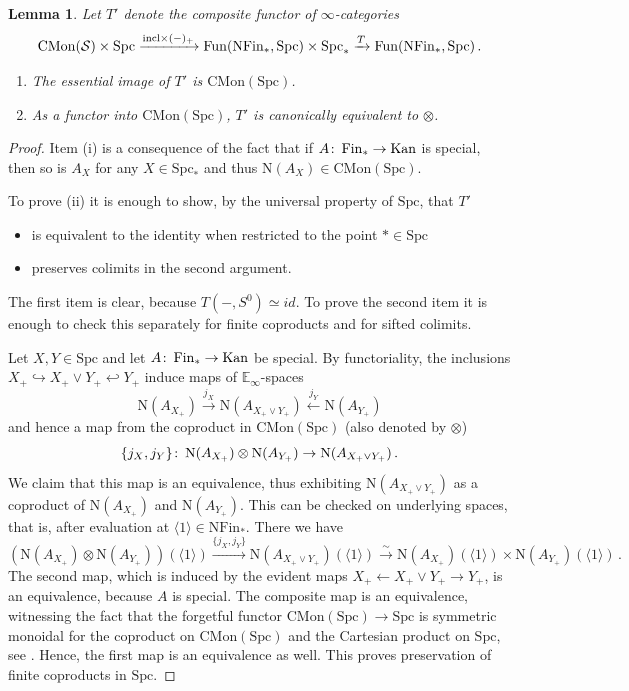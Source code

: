 \documentclass[oneside, a4paper, 12pt]{article}
\numberwithin{equation}{section}
\DeclareMathOperator{\Fun}{Fun}
\newcommand{\CMon}{\mathrm{CMon}}
\newcommand{\Spc}{\mathrm{Spc}}
\newcommand{\Fin}{\mathrm{Fin}}
\newcommand{\Kan}{\mathrm{Kan}}
\newcommand{\co}{\colon\thinspace}
\theoremstyle{plain}
\newtheorem{lemma}[theorem]{Lemma}
\theoremstyle{definition}
\theoremstyle{remark}
\begin{document}
\begin{lemma} \label{lem:tensoring}
Let $T'$ denote the composite functor of $\infty$-categories
\[
\CMon(\mathcal{S}) \times \Spc \xrightarrow{\textnormal{incl}\times (-)_+}  \Fun(\mathrm{N}\Fin_\ast,\Spc)\times \Spc_\ast \xrightarrow{T} \Fun(\mathrm{N}\Fin_\ast,\Spc)\, .
\]
\begin{enumerate}
\item[(i)] The essential image of $T'$ is $\CMon(\Spc)$.
\item[(ii)] As a functor into $\CMon(\Spc)$, $T'$ is canonically equivalent to $\otimes$.
\end{enumerate}
\end{lemma}
\begin{proof}
Item (i) is a consequence of the fact that if $A\co \Fin_\ast\to \Kan$ is special, then so is $A_X$ for any $X\in \Spc_\ast$ and thus $\mathrm{N}(A_X)\in \CMon(\Spc)$.

To prove (ii) it is enough to show, by the universal property of $\Spc$, that $T'$
\begin{itemize}
\item is equivalent to the identity when restricted to the point $\ast\in \Spc$
\item preserves colimits in the second argument.
\end{itemize}

The first item is clear, because $T(-,S^0)\simeq id$. To prove the second item it is enough to check this separately for finite coproducts and for sifted colimits.

Let $X,Y\in \Spc$ and let $A\co \Fin_\ast\to \Kan$ be special. By functoriality, the inclusions $X_+\hookrightarrow X_+\vee Y_+ \hookleftarrow Y_+$ induce maps of $\mathbb{E}_\infty$-spaces
\[
\mathrm{N} (A_{X_+}) \xrightarrow{j_X} \mathrm{N} (A_{X_+\vee Y_+}) \xleftarrow{j_Y} \mathrm{N}(A_{Y_+})
\]
and hence a map from the coproduct in $\CMon(\Spc)$ (also denoted by $\otimes$)
\[
\{j_X,j_Y\}\co \mathrm{N} (A_{X_+}) \otimes \mathrm{N}(A_{Y_+}) \to  \mathrm{N} (A_{X_+\vee Y_+})\, .
\]
We claim that this map is an equivalence, thus exhibiting $\mathrm{N} (A_{X_+\vee Y_+})$ as a coproduct of $\mathrm{N} (A_{X_+})$ and $\mathrm{N} (A_{Y_+})$. This can be checked on underlying spaces, that is, after evaluation at $\langle 1\rangle\in \mathrm{N}\Fin_\ast$. There we have
\[
(\mathrm{N}(A_{X_+}) \otimes \mathrm{N}(A_{Y_+}))(\langle 1\rangle) \xrightarrow{\{j_X,j_Y\}}  \mathrm{N} (A_{X_+\vee Y_+})(\langle 1\rangle) \xrightarrow{\sim} \mathrm{N}(A_{X_+})(\langle 1\rangle)\times \mathrm{N}(A_{Y_+})(\langle 1\rangle)\, .
\]
The second map, which is induced by the evident maps $X_+\leftarrow X_+\vee Y_+\to Y_+$, is an equivalence, because $A$ is special. The composite map is an equivalence, witnessing the fact that the forgetful functor $\CMon(\Spc)\to \Spc$ is symmetric monoidal for the coproduct on $\CMon(\Spc)$ and the Cartesian product on $\Spc$, see \cite[3.2.4.7]{HA}. Hence, the first map is an equivalence as well. This proves preservation of finite coproducts in $\Spc$.



\end{proof}
\end{document}
